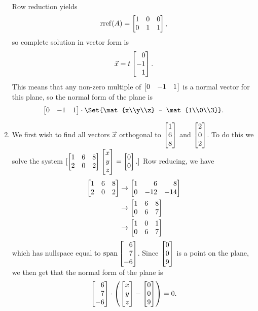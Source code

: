 \begin{exercises}
\begin{problist}
\begin{solution}
\begin{enumerate}
\begin{align*}
					\end{align*}
					Row reduction yields
					\begin{align*}
						\Rref(A) = \mat{1&0&0\\0&1&1},
					\end{align*}
					so complete solution in vector form is 
					\begin{align*}
						\vec x = t\mat{0\\-1\\1}.
					\end{align*}
					This means that any non-zero multiple of $\mat{0&-1&1}$ is a normal vector for this plane, so the normal form of the plane is 
					\begin{align*}
						\mat{0&-1&1} \cdot \Set{\mat{x\\y\\z} - \mat{1\\0\\3}}.
					\end{align*}
				\item  We first wish to find all vectors $\vec x$ orthogonal to $\mat{1\\6\\8}$ and $\mat{2\\0\\2}$. To do this we solve the system 
					$[\mat{1&6&8\\2&0&2}\mat{x\\y\\z}=\mat{0\\0}.]$ 
					Row reducing, we have 
					\begin{align*}
						\mat{1&6&8\\2&0&2}&\rightarrow \mat{1&6&8\\0&-12&-14}\\
						&\rightarrow \mat{1&6&8\\0&6&7}\\
						&\rightarrow \mat{1&0&1\\0&6&7}\\
					\end{align*}
					which has nullspace equal to $\Span{\mat{6\\7\\-6}}$.
					Since $\mat{0\\0\\9}$ is a point on the plane, we then get that the normal form of the plane is \[\mat{6\\7\\-6}\cdot \left(\mat{x\\y\\z}-\mat{0\\0\\9}\right)=0.\]

\end{enumerate}
\end{solution}
\end{problist}
\end{exercises}
